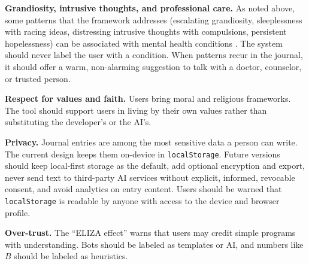 \documentclass[11pt]{article}
\begin{document}
\textbf{Grandiosity, intrusive thoughts, and professional care.} As noted above, some patterns that the framework addresses (escalating grandiosity, sleeplessness with racing ideas, distressing intrusive thoughts with compulsions, persistent hopelessness) can be associated with mental health conditions \citep{apa2013}. The system should never label the user with a condition. When patterns recur in the journal, it should offer a warm, non-alarming suggestion to talk with a doctor, counselor, or trusted person.

\textbf{Respect for values and faith.} Users bring moral and religious frameworks. The tool should support users in living by their own values rather than substituting the developer's or the AI's.

\textbf{Privacy.} Journal entries are among the most sensitive data a person can write. The current design keeps them on-device in \texttt{localStorage}. Future versions should keep local-first storage as the default, add optional encryption and export, never send text to third-party AI services without explicit, informed, revocable consent, and avoid analytics on entry content. Users should be warned that \texttt{localStorage} is readable by anyone with access to the device and browser profile.

\textbf{Over-trust.} The ``ELIZA effect'' \citep{weizenbaum1966} warns that users may credit simple programs with understanding. Bots should be labeled as templates or AI, and numbers like $B$ should be labeled as heuristics.
\end{document}
